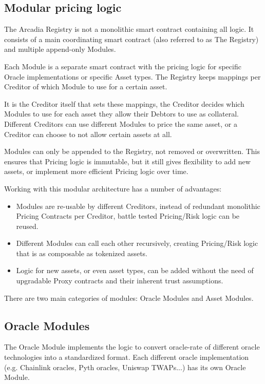 \documentclass[sigconf,nonacm]{acmart}
\begin{document}
\subsection{Modular pricing logic}
\label{subsec:modular-pricing-logic}
The Arcadia Registry is not a monolithic smart contract containing all logic.
It consists of a main coordinating smart contract (also referred to as The Registry) and multiple append-only Modules.

Each Module is a separate smart contract with the pricing logic for specific Oracle implementations or specific Asset types.
The Registry keeps mappings per Creditor of which Module to use for a certain asset.


It is the Creditor itself that sets these mappings, the Creditor decides which Modules to use for each asset they allow their Debtors to use as collateral.
Different Creditors can use different Modules to price the same asset, or a Creditor can choose to not allow certain assets at all.

Modules can only be appended to the Registry, not removed or overwritten.
This ensures that Pricing logic is immutable, but it still gives flexibility to add new assets, or implement more efficient Pricing logic over time.

Working with this modular architecture has a number of advantages:
\begin{itemize}
    \item Modules are re-usable by different Creditors, instead of redundant monolithic Pricing Contracts per Creditor, battle tested Pricing/Risk logic can be reused.
    \item Different Modules can call each other recursively, creating Pricing/Risk logic that is as composable as tokenized assets.
    \item Logic for new assets, or even asset types, can be added without the need of upgradable Proxy contracts and their inherent trust assumptions.
\end{itemize}

There are two main categories of modules: Oracle Modules and Asset Modules.

\subsection{Oracle Modules}
The Oracle Module implements the logic to convert oracle-rate of different oracle technologies into a standardized format.
Each different oracle implementation (e.g. Chainlink oracles, Pyth oracles, Uniswap TWAPs...) has its own Oracle Module.
\end{document}
